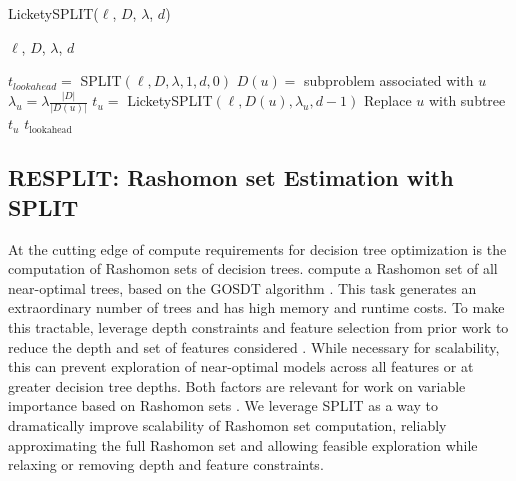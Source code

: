 \begin{algorithm}[ht]
\caption{LicketySPLIT($\ell$, $D$, $\lambda$, $d$)}\label{alg::recursive_lookahead}
\begin{algorithmic}[1]
\REQUIRE $\ell$, $D$, $\lambda$, $d$ \COMMENT{\textcolor{commentgreen}{loss function, samples, regularizer, full depth}}
\item $t_{lookahead} = $ SPLIT$(\ell, D, \lambda,1,d,0)$ \COMMENT{\textcolor{commentgreen}{Call SPLIT with lookahead depth $1$ and no post-processing}}
    \STATE $D(u) = $ subproblem associated with $u$
    \STATE $\lambda_{u} = \lambda \frac{|D|}{|D(u)|}$ \COMMENT{\textcolor{commentgreen}{Renormalize $\lambda$ for the subproblem in question}}
    \STATE $t_u = $ LicketySPLIT$(\ell, D(u), \lambda_{u}, d - 1)$
    \STATE Replace $u$ with subtree $t_u$
\ENDFOR
\ENDIF
\RETURN $t_\textrm{lookahead}$
\end{algorithmic}
\end{algorithm}

\subsection{RESPLIT: Rashomon set Estimation with SPLIT}

At the cutting edge of compute requirements for decision tree optimization is the computation of Rashomon sets of decision trees. \citet{xin2022treefarms} compute a Rashomon set of all near-optimal trees, based on the GOSDT algorithm \cite{gosdt}. This task generates an extraordinary number of trees and has high memory and runtime costs. To make this tractable, \citet{xin2022treefarms} leverage depth constraints and feature selection from prior work to reduce the depth and set of features considered \citep{gosdt_guesses}. While necessary for scalability, this can prevent exploration of near-optimal models across all features or at greater decision tree depths. Both factors are relevant for work on variable importance based on Rashomon sets \citep{fisher2018model, dong2020exploring, donnelly2023the}. We leverage SPLIT as a way to dramatically improve scalability of Rashomon set computation, reliably approximating the full Rashomon set and allowing feasible exploration while relaxing or removing depth and feature constraints.

